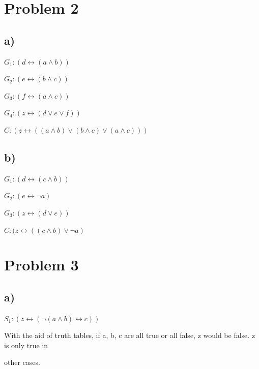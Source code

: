 \documentclass{article} %
\begin{document}
\section*{Problem 2}

\subsection*{\hspace{1cm}a)}
\begin{flushleft}
\hspace{2cm}$G_1: (d \leftrightarrow (a \land b))$

\hspace{2cm}$G_2: (e \leftrightarrow (b \land c))$

\hspace{2cm}$G_3: (f \leftrightarrow (a \land c))$

\hspace{2cm}$G_4: (z \leftrightarrow (d \lor e \lor f))$

\hspace{2cm}$C: (z \leftrightarrow ((a \land b) \lor (b \land c) \lor (a \land c)))$
\end{flushleft}

\subsection*{\hspace{1cm}b)}
\begin{flushleft}
\hspace{2cm}$G_1: (d \leftrightarrow (c \land b))$

\hspace{2cm}$G_2: (e \leftrightarrow \neg a)$

\hspace{2cm}$G_3: (z \leftrightarrow (d \lor e))$

\hspace{2cm}$C: (z \leftrightarrow ((c \land b) \lor \neg a)$
\end{flushleft}

\newpage

\section*{Problem 3}

\subsection*{\hspace{1cm}a)}
\begin{flushleft}
\hspace{2cm}$S_1: (z \leftrightarrow (\neg(a \land b) \leftrightarrow c))$

\hspace{2cm}With the aid of truth tables, if a, b, c are all true or all false, z would be false. z is only true in

\hspace{2cm} other cases.
\end{flushleft}
\end{document}
